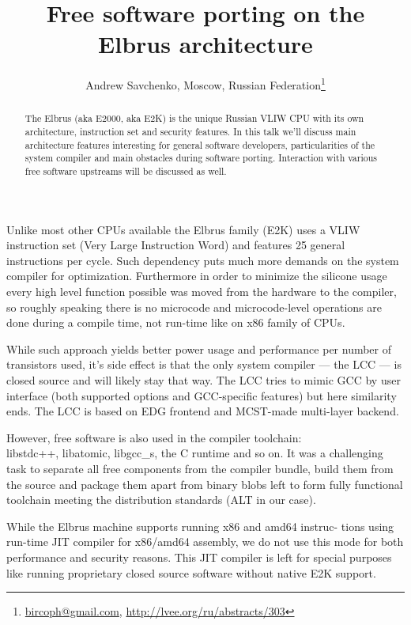 \documentclass[10pt, a5paper]{article}
\begin{document}
\title{Free software porting on the Elbrus architecture}
\author{Andrew Savchenko, Moscow, Russian Federation\footnote{\url{bircoph@gmail.com}, \url{http://lvee.org/ru/abstracts/303}}}
\maketitle
\begin{abstract}
The Elbrus (aka E2000, aka E2K) is the unique Russian VLIW CPU with its own architecture, instruction set and security fea\-tures. In this talk we'll discuss main architecture features interes\-ting for general software developers, particularities of the system compiler and main obstacles during software porting. Interaction with various free software upstreams will be discussed as well.
\end{abstract}
Unlike most other CPUs available the Elbrus family (E2K) uses a VLIW instruction set (Very Large Instruction Word) and features 25 general instructions per cycle. Such dependency puts much more demands on the system compiler for optimization. Furthermore in order to minimize the silicone usage every high level function possible was moved from the hardware to the compiler, so roughly speaking there is no microcode and microcode-level operations are done during a compile time, not run-time like on x86 family of CPUs.

While such approach yields better power usage and performance per number of transistors used, it's side effect is that the only system compiler — the LCC — is closed source and will likely stay that way. The LCC tries to mimic GCC by user interface (both supported options and GCC-specific features) but here similarity ends. The LCC is based on EDG\cite{Savchenko1} frontend and MCST-made multi-layer backend.

However, free software is also used in the compiler toolchain: \\libstdc++, libatomic, libgcc\_s, the C runtime and so on. It was a challenging task to separate all free components from the compiler bundle, build them from the source and package them apart from binary blobs left to form fully functional toolchain meeting the distribution standards (ALT in our case).

While the Elbrus machine supports running x86 and amd64 instruc- tions using run-time JIT compiler for x86/amd64 assembly, we do not use this mode for both performance and security reasons. This JIT compiler is left for special purposes like running proprietary closed source software without native E2K support.
\end{document}
